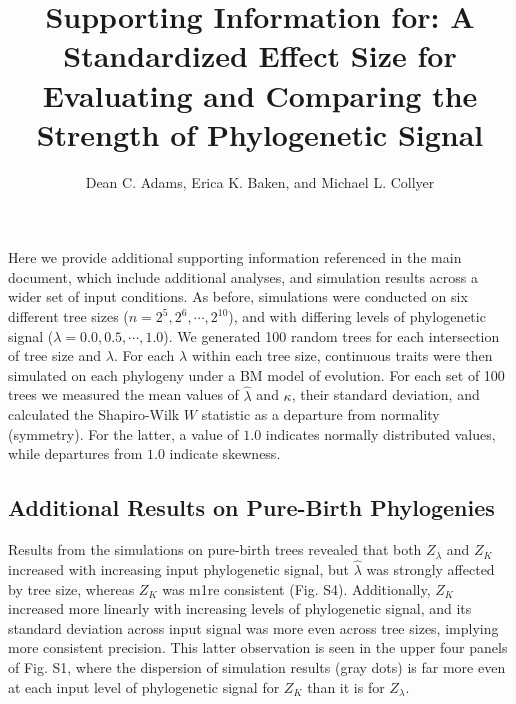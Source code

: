 \documentclass[
]{article}
\title{Supporting Information for: A Standardized Effect Size for Evaluating
and Comparing the Strength of Phylogenetic Signal}
\author{Dean C. Adams, Erica K. Baken, and Michael L. Collyer}
\date{}
\begin{document}
\maketitle

Here we provide additional supporting information referenced in the main
document, which include additional analyses, and simulation results
across a wider set of input conditions. As before, simulations were
conducted on six different tree sizes (\(n=2^5, 2^6, \cdots, 2^{10}\)),
and with differing levels of phylogenetic signal
(\(\lambda=0.0, 0.5, \cdots, 1.0\)). We generated 100 random trees for
each intersection of tree size and \(\lambda\). For each \(\lambda\)
within each tree size, continuous traits were then simulated on each
phylogeny under a BM model of evolution. For each set of 100 trees we
measured the mean values of \(\hat{\lambda}\) and \(\kappa\), their
standard deviation, and calculated the Shapiro-Wilk \(W\) statistic as a
departure from normality (symmetry). For the latter, a value of \(1.0\)
indicates normally distributed values, while departures from \(1.0\)
indicate skewness.

\hypertarget{additional-results-on-pure-birth-phylogenies}{%
\subsection{Additional Results on Pure-Birth
Phylogenies}\label{additional-results-on-pure-birth-phylogenies}}

Results from the simulations on pure-birth trees revealed that both
\(Z_{\lambda}\) and \(Z_K\) increased with increasing input phylogenetic
signal, but \(\hat{\lambda}\) was strongly affected by tree size,
whereas \(Z_K\) was m1re consistent (Fig. S4). Additionally, \(Z_K\)
increased more linearly with increasing levels of phylogenetic signal,
and its standard deviation across input signal was more even across tree
sizes, implying more consistent precision. This latter observation is
seen in the upper four panels of Fig. S1, where the dispersion of
simulation results (gray dots) is far more even at each input level of
phylogenetic signal for \(Z_K\) than it is for \(Z_{\lambda}\).
\end{document}
